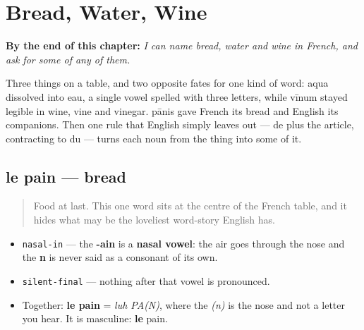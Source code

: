 
\chapter{Bread, Water, Wine}
\label{ch:food}

\begin{chapteropening}
\textbf{By the end of this chapter:} \emph{I can name bread, water and wine in French, and ask for some of any of them.}

Three things on a table, and two opposite fates for one kind of word: aqua dissolved into eau, a single vowel spelled with three letters, while vīnum stayed legible in wine, vine and vinegar. pānis gave French its bread and English its companions. Then one rule that English simply leaves out — de plus the article, contracting to du — turns each noun from the thing into some of it.
\end{chapteropening}

\section[le pain]{le pain — bread}

\label{lesson:FR-C11-pain}



\begin{quote}
Food at last. This one word sits at the centre of the French table, and it hides what may be the loveliest word-story English has.
\end{quote}

\begin{sounds}
\begin{itemize}
\raggedright
  \item \texttt{nasal-in} — the \textbf{-ain} is a \textbf{nasal vowel}: the air goes through the nose and the \textbf{n} is never said as a consonant of its own.
  \item \texttt{silent-final} — nothing after that vowel is pronounced.
  \item Together: \textbf{le pain} = \emph{luh PA(N)}, where the \emph{(n)} is the nose and not a letter you hear. It is masculine: \textbf{le} pain.
\end{itemize}
\end{sounds}


